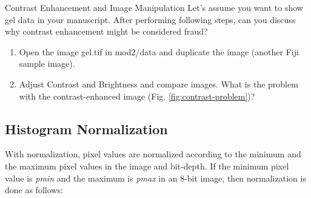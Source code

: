 \begin{taskbox}{Contrast Enhancement and Image Manipulation}
Let's assume you want to show gel data in your manuscript. After performing following steps, can you discuss why contrast enhancement might be considered fraud?
\begin{enumerate}
	\item Open the image gel.tif in mod2/data and duplicate the image (another Fiji sample image).
	\item Adjust Contrast and Brightness and compare images. What is the problem with the contrast-enhanced image (Fig. \ref{fig:contrast-problem})?
	
	\begin{minipage}[t]{\linewidth}
		\begin{center}
		\medskip
		\label{fig:contrast-problem}
		\end{center}
	\end{minipage}
	
	\end{enumerate}
\end{taskbox}

\subsection{Histogram Normalization}
With normalization, pixel values are normalized according to the minimum and the maximum pixel values in the image and bit-depth. If the minimum pixel value is \emph{pmin} and the maximum is \emph{pmax} in an 8-bit image, then normalization is done as follows:

